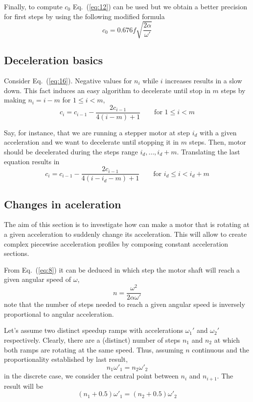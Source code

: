 \documentclass[a4paper]{article}
\begin{document}
Finally, to compute $c_0$ Eq.~(\ref{eq:12}) can be used but we obtain
a better precision for first steps by using the following modified
formula
\begin{equation}
  \label{eq:17}
  c_0 = 0.676 f \sqrt{\frac{2\alpha}{\omega'}}  
\end{equation}


\subsection{Deceleration basics}

Consider Eq.~(\ref{eq:16}). Negative values for $n_i$ while $i$
increases results in a slow down. This fact induces an easy algorithm
to decelerate until stop in $m$ steps by making $n_i=i-m$ for
$1\leq i<m$,
\begin{equation}
  \label{eq:18}
  c_i = c_{i-1} - \frac{2c_{i-1}}{4(i - m) + 1} \qquad\text{for $1\leq i<m$}  
\end{equation}

Say, for instance, that we are running a stepper motor at step $i_d$
with a given acceleration and we want to decelerate until stopping it
in $m$ steps. Then, motor should be decelerated during the steps range
$i_d,\dots,i_d+m$. Translating the last equation results in
\begin{equation*}
    c_i  = c_{i-1} - \frac{2c_{i-1}}{4(i-i_d - m) + 1} \qquad\text{for $i_d\leq i<i_d+m$}
\end{equation*}




\subsection{Changes in aceleration}

The aim of this section is to investigate how can make a motor that is
rotating at a given acceleration to suddenly change its
acceleration. This will allow to create complex piecewise acceleration
profiles by composing constant acceleration sections.

From Eq.~(\ref{eq:8}) it can be deduced in which step the motor shaft
will reach a given angular speed of $\omega$,
\begin{equation*}
  n = \frac{\omega^2}{2\alpha\omega'}  
\end{equation*}
note that the number of steps needed to reach a given angular speed is
inversely proportional to angular acceleration.


Let's assume two distinct speedup ramps with accelerations $\omega_1'$
and $\omega_2'$ respectively. Clearly, there are a (distinct) number
of steps $n_1$ and $n_2$ at which both ramps are rotating at the same
speed. Thus, assuming $n$ continuous and the proportionality
established by last result,
\begin{equation*}
   n_1\omega'_1 = n_2\omega'_2
\end{equation*}
in the discrete case, we consider the central point between $n_i$ and
$n_{i+1}$. The result will be
\begin{equation}
  \label{eq:21}
  (n_1+0.5)\omega'_1 = (n_2+0.5)\omega'_2
\end{equation}
\end{document}
